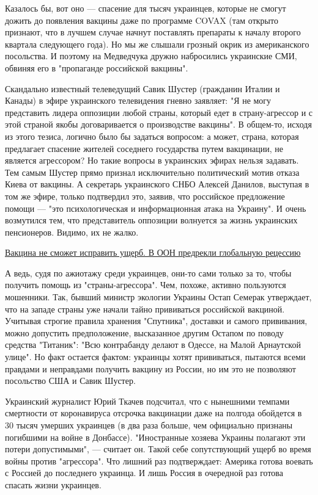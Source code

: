 Казалось бы, вот оно — спасение для тысяч украинцев, которые не смогут дожить
до появления вакцины даже по программе COVAX (там открыто признают, что в
лучшем случае начнут поставлять препараты к началу второго квартала следующего
года). Но мы же слышали грозный окрик из американского посольства. И поэтому на
Медведчука дружно набросились украинские СМИ, обвиняя его в "пропаганде
российской вакцины".

Скандально известный телеведущий Савик Шустер (гражданин Италии и Канады) в
эфире украинского телевидения гневно заявляет: "Я не могу представить лидера
оппозиции любой страны, который едет в страну-агрессор и с этой страной якобы
договаривается о производстве вакцины". В общем-то, исходя из этого тезиса,
логично было бы задаться вопросом: а может, страна, которая предлагает спасение
жителей соседнего государства путем вакцинации, не является агрессором? Но
такие вопросы в украинских эфирах нельзя задавать. Тем самым Шустер прямо
признал исключительно политический мотив отказа Киева от вакцины. А секретарь
украинского СНБО Алексей Данилов, выступая в том же эфире, только подтвердил
это, заявив, что российское предложение помощи — "это психологическая и
информационная атака на Украину". И очень возмутился тем, что представитель
оппозиции волнуется за жизнь украинских пенсионеров. Видимо, их не жалко.

\href{https://radiosputnik.ria.ru/20201211/retsessiya-1588841440.html?in=t}{Вакцина не сможет исправить ущерб. В ООН предрекли глобальную рецессию}

А ведь, судя по ажиотажу среди украинцев, они-то сами только за то, чтобы
получить помощь из "страны-агрессора". Чем, похоже, активно пользуются
мошенники. Так, бывший министр экологии Украины Остап Семерак утверждает, что
на западе страны уже начали тайно прививаться российской вакциной. Учитывая
строгие правила хранения "Спутника", доставки и самого прививания, можно
допустить предположение, высказанное другим Остапом по поводу средства
"Титаник": "Всю контрабанду делают в Одессе, на Малой Арнаутской улице". Но
факт остается фактом: украинцы хотят прививаться, пытаются всеми правдами и
неправдами получить вакцину из России, но им это не позволяют посольство США и
Савик Шустер.

Украинский журналист Юрий Ткачев подсчитал, что с нынешними темпами смертности
от коронавируса отсрочка вакцинации даже на полгода обойдется в 30 тысяч
умерших украинцев (в два раза больше, чем официально признаны погибшими на
войне в Донбассе). "Иностранные хозяева Украины полагают эти потери
допустимыми", — считает он. Такой себе сопутствующий ущерб во время войны
против "агрессора". Что лишний раз подтверждает: Америка готова воевать с
Россией до последнего украинца. И лишь Россия в очередной раз готова спасать
жизни украинцев.
